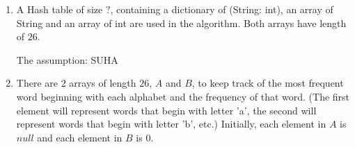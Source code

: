 \documentclass[11pt, answers]{exam}
\theoremstyle{plain}
\theoremstyle{definition}
\begin{document}
\begin{questions}
\question
\begin{solution}
\end{solution}


\question
\begin{solution}
\begin{enumerate}
\item A Hash table of size $?$, containing a dictionary of (String: int), an array of String and an array of int are used in the algorithm. Both arrays have length of $26$.

The assumption: SUHA%

\item There are $2$ arrays of length $26$, $A$ and $B$, to keep track of the most frequent word beginning with each alphabet and the frequency of that word. (The first element will represent words that begin with letter 'a', the second will represent words that begin with letter 'b', etc.) Initially, each element in $A$ is $null$ and each element in $B$ is $0$. 


\end{enumerate}
\end{solution}
\end{questions}
\end{document}
